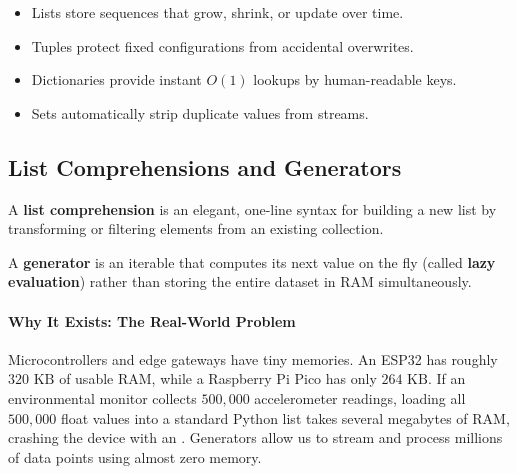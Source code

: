 \begin{takeaways}
\begin{itemize}
    \item Lists store sequences that grow, shrink, or update over time.
    \item Tuples protect fixed configurations from accidental overwrites.
    \item Dictionaries provide instant $O(1)$ lookups by human-readable keys.
    \item Sets automatically strip duplicate values from streams.
\end{itemize}
\end{takeaways}

\subsection{List Comprehensions and Generators}

\begin{keyidea}
A \textbf{list comprehension} is an elegant, one-line syntax for building a new list by transforming or filtering elements from an existing collection.

A \textbf{generator} is an iterable that computes its next value on the fly (called \textbf{lazy evaluation}) rather than storing the entire dataset in RAM simultaneously.
\end{keyidea}

\paragraph{Why It Exists: The Real-World Problem}
Microcontrollers and edge gateways have tiny memories. An ESP32 has roughly $320\text{ KB}$ of usable RAM, while a Raspberry Pi Pico has only $264\text{ KB}$. If an environmental monitor collects $500{,}000$ accelerometer readings, loading all $500{,}000$ float values into a standard Python list takes several megabytes of RAM, crashing the device with an . Generators allow us to stream and process millions of data points using almost zero memory.

